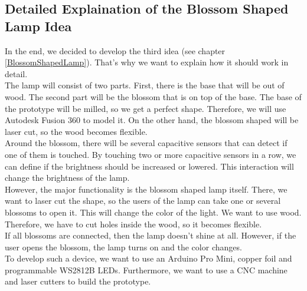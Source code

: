 \documentclass[04_projectProcess.tex]{subfiles}
\begin{document}
    \subsection{Detailed Explaination of the Blossom Shaped Lamp Idea}
        \begin{flushleft}
            In the end, we decided to develop the third idea (see chapter \ref{BlossomShapedLamp}). 
            That's why we want to explain how it should work in detail. \\
            The lamp will consist of two parts. First, there is the base that will be out of wood. The
            second part will be the blossom that is on top of the base. The base of the prototype will 
            be milled, so we get a perfect shape. Therefore, we will use Autodesk Fusion 360\cite{
            autodeskFusion360} to model it. On the other hand, the blossom shaped will be laser cut, 
            so the wood becomes flexible.\\
            Around the blossom, there will be several capacitive sensors that can detect if one of them 
            is touched. By touching two or more capacitive sensors in a row, we can define if the 
            brightness should be increased or lowered. This interaction will change the brightness of 
            the lamp. \\
            However, the major functionality is the blossom shaped lamp itself. There, we want to laser 
            cut the shape, so the users of the lamp can take one or several blossoms to open it. This will 
            change the color of the light. We want to use wood. Therefore, we have to cut holes inside 
            the wood, so it becomes flexible.\\
            If all blossoms are connected, then the lamp doesn't shine at all. However, if the user opens 
            the blossom, the lamp turns on and the color changes.\\
            To develop such a device, we want to use an Arduino Pro Mini, copper foil and programmable 
            WS2812B LEDs. Furthermore, we want to use a CNC machine and laser cutters to build the 
            prototype.
        \end{flushleft}
\end{document}
